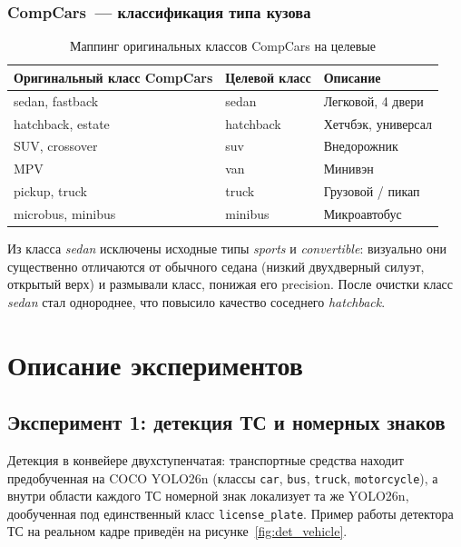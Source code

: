 \documentclass[10pt,a4paper]{report}
\numberwithin{equation}{chapter}
\numberwithin{figure}{chapter}
\numberwithin{table}{chapter}
\begin{document}
\subsection{CompCars~--- классификация типа кузова}

\begin{table}[H]
\centering
\caption{Маппинг оригинальных классов CompCars на целевые}
\label{tab:compcars}
\begin{tabularx}{\textwidth}{lXX}
\toprule
\textbf{Оригинальный класс CompCars} & \textbf{Целевой класс} & \textbf{Описание} \\
\midrule
sedan, fastback              & sedan    & Легковой, 4 двери \\
hatchback, estate            & hatchback& Хетчбэк, универсал \\
SUV, crossover               & suv      & Внедорожник \\
MPV                          & van      & Минивэн \\
pickup, truck                & truck    & Грузовой / пикап \\
microbus, minibus            & minibus  & Микроавтобус \\
\bottomrule
\end{tabularx}
\end{table}

Из класса \textit{sedan} исключены исходные типы \textit{sports} и
\textit{convertible}: визуально они существенно отличаются от обычного
седана (низкий двухдверный силуэт, открытый верх) и размывали класс,
понижая его precision. После очистки класс \textit{sedan} стал
однороднее, что повысило качество соседнего \textit{hatchback}.

\chapter{Описание экспериментов}

\section{Эксперимент 1: детекция ТС и номерных знаков}

Детекция в конвейере двухступенчатая: транспортные средства находит
предобученная на COCO YOLO26n (классы \texttt{car}, \texttt{bus},
\texttt{truck}, \texttt{motorcycle}), а внутри области каждого ТС номерной
знак локализует та же YOLO26n, дообученная под единственный класс
\texttt{license\_plate}. Пример работы детектора ТС на реальном кадре
приведён на рисунке~\ref{fig:det_vehicle}.
\end{document}
